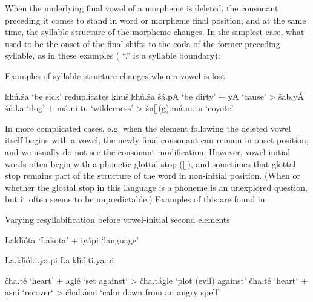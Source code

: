 \documentclass[output=paper]{LSP/langsci}
\begin{document}
When the underlying final vowel of a morpheme is deleted, the consonant preceding it comes to stand in word or morpheme final position, and at the same time, the syllable structure of the morpheme changes. In the simplest case, what used to be the onset of the final shifts to the coda of the former preceding syllable, as in these examples ( ``.'' is a syllable boundary):

\begin{exe}\label{ex:rood:12}
\ex Examples of syllable structure changes when a vowel is lost
\begin{xlist}
\ex kh\'u.\v{z}a `be sick' reduplicates khu\v{s}.kh\'u.\v{z}a
\ex \v{s}\'a.pA `be dirty' + yA `cause' > \v{s}ab.y\'A
\ex \v{s}\'u.ka `dog' + m\'a.ni.tu `wilderness' > \v{s}u[](g).m\'a.ni.tu `coyote'
\end{xlist}
\end{exe}

In more complicated cases, e.g. when the element following the deleted vowel itself begins with a vowel, the newly final consonant can remain in onset position, and we usually do not see the consonant modification. However, vowel initial words often begin with a phonetic glottal stop ([]), and sometimes that glottal stop remains part of the structure of the word in non-initial position. (When or whether the glottal stop in this language is a phoneme is an unexplored question, but it often seems to be unpredictable.) Examples of this are found in :

\begin{exe}\label{ex:rood:13}
\ex Varying resyllabification before vowel-initial second elements
\begin{xlist}
\ex Lak\v{h}\'ota `Lakota' + iy\'api `language'
\begin{xlist}
\ex La.k\v{h}\'ol.i.ya.pi
\ex La.k\v{h}\'o.ti.ya.pi
\end{xlist}
\ex 
\begin{xlist}
\ex \v{c}ha.t\'e `heart' + agl\'e `set against` > \v{c}ha.t\'agle `plot (evil) against'
\ex \v{c}ha.t\'e `heart` + asn\'i `recover` > \v{c}hal.\'asni `calm down from an angry spell'
\end{xlist}
\end{xlist}
\end{exe}
\end{document}
